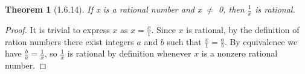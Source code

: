 \documentclass[a4paper, 12pt]{article}
\theoremstyle{plain}
\newtheorem*{theorem*}{Theorem}
\begin{document}
	
	\begin{theorem*}[1.6.14]
		If x is a rational number and x $\neq$ 0, then $\frac{1}{x}$ is rational.
	\end{theorem*}
	
	\begin{proof}
		It is trivial to express $x$ as $x = \frac{x}{1}$. Since $x$ is rational, by the definition of 
		ration numbers there exist integers $a$ and $b$ such that $\frac{x}{1} = \frac{a}{b}$. By 
		equivalence we have $\frac{b}{a} = \frac{1}{x}$, so $\frac{1}{x}$ is rational by definition 
		whenever $x$ is a nonzero rational number.
	\end{proof}
\end{document}
